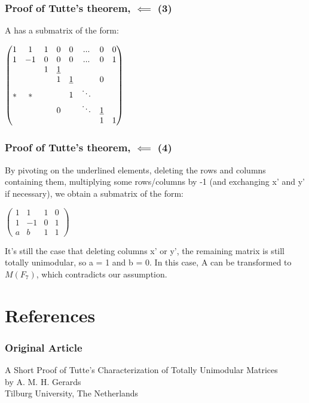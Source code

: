 \documentclass{beamer}
\begin{document}
\begin{frame}
\frametitle{Proof of Tutte's theorem, $\impliedby$ (3)}
A has a submatrix of the form:\\
\begin{center}
$\begin{pmatrix}
1 & 1 & 1 & 0 & 0 & ... & 0 & 0\\
1 & -1 & 0 & 0 & 0 & ... & 0 & 1\\
   &     & 1 & \underline{1} &   &   &   & \\
   &     &    & 1 & \underline{1} & & \mathlarger{0} & \\
* & * &  &  &  1 & \ddots &  &  \\
 &  & & \mathlarger{0} &  & \ddots & \underline{1} & \\
 & & & & & & 1 & 1
\end{pmatrix}$
\end{center}
\end{frame}

\begin{frame}
\frametitle{Proof of Tutte's theorem, $\impliedby$ (4)}
By pivoting on the underlined elements, deleting the rows and columns containing them, multiplying some rows/columns by -1 (and exchanging x' and y' if necessary), we obtain a submatrix of the form:\\
\begin{center}
$\begin{pmatrix}
1 & 1 & 1 & 0 \\
1 & -1 & 0 & 1 \\
a & b & 1 & 1
\end{pmatrix}$
\end{center}
It's still the case that deleting columns x' or y', the remaining matrix is still totally unimodular, so a = 1 and b = 0. In this case, A can be transformed to $M(F_7)$, which contradicts our assumption.
\end{frame}

\section{References}
\begin{frame} 
\frametitle{Original Article}
A Short Proof of Tutte's Characterization of Totally Unimodular Matrices\\
by A. M. H. Gerards\\
Tilburg University, The Netherlands
\end{frame}
 
\end{document}
